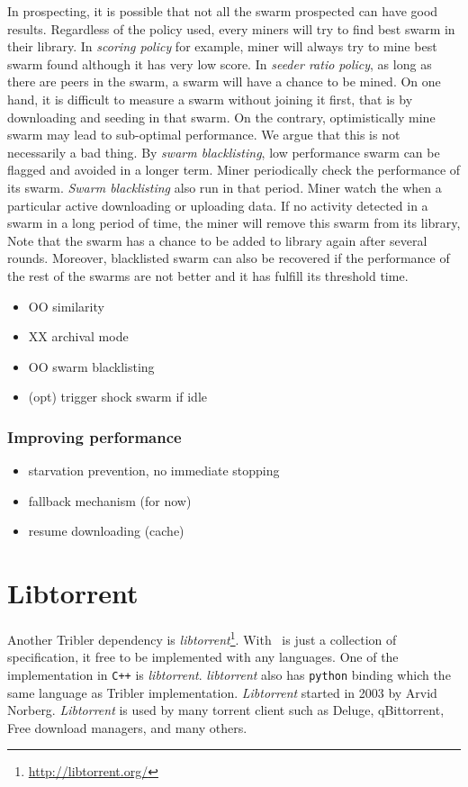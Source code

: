 In prospecting, it is possible that not all the swarm prospected can have good results. Regardless of the policy used, every miners will try to find best swarm in their library. In \textit{scoring policy} for example, miner will always try to mine best swarm found although it has very low score. In \textit{seeder ratio policy}, as long as there are peers in the swarm, a swarm will have a chance to be mined. On one hand, it is difficult to measure a swarm without joining it first, that is by downloading and seeding in that swarm. On the contrary, optimistically mine swarm may lead to sub-optimal performance. We argue that this is not necessarily a bad thing. By \textit{swarm blacklisting}, low performance swarm can be flagged and avoided in a longer term. Miner periodically check the performance of its swarm. \textit{Swarm blacklisting} also run in that period. Miner watch the when a particular active downloading or uploading data. If no activity detected in a swarm in a long period of time, the miner will remove this swarm from its library, Note that the swarm has a chance to be added to library again after several rounds. Moreover, blacklisted swarm can also be recovered if the performance of the rest of the swarms are not better and it has fulfill its threshold time. 

\begin{itemize}
	\item OO similarity	
	\item XX archival mode
	\item OO swarm blacklisting
	\item (opt) trigger shock swarm if idle
\end{itemize}
\subsubsection{Improving performance}
\begin{itemize}
	\item starvation prevention, no immediate stopping
	\item fallback mechanism (for now)
	\item 	 resume downloading (cache)
\end{itemize}


\section{Libtorrent}
\label{section:libtorrent}
Another Tribler dependency is \textit{libtorrent}\footnote{\url{http://libtorrent.org/}}. With \bt~is just a collection of specification, it free to be implemented with any languages. One of the implementation in \texttt{C++} is \textit{libtorrent}. \textit{libtorrent} also has \texttt{python} binding which the same language as Tribler implementation. \textit{Libtorrent} started in 2003 by Arvid Norberg. \textit{Libtorrent} is used by many torrent client such as Deluge, qBittorrent, Free download managers, and many others.

